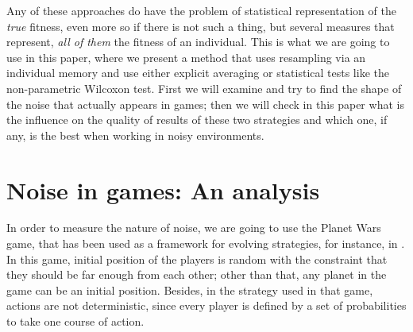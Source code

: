\documentclass{llncs}
\begin{document}
Any of these approaches do have the problem of statistical
representation of the {\em true} fitness, even more so if there is not
such a thing, but several measures that represent, {\em all of them}
the fitness of an individual. This is what we are going to use in this
paper, where we present a method that uses resampling via an
individual memory and use either explicit averaging or statistical
tests like the non-parametric Wilcoxon test. 
First we will examine and try to find the shape of the noise that
actually appears in games; then we will check in this paper what is the influence on the quality of
results of these two strategies and which one, if any, is the best when working in noisy environments. 


\section{Noise in games: An analysis}
\label{sec:noise}

In order to measure the nature of noise, we are going to use the
Planet Wars game, that has been used as a framework for evolving
strategies, for instance, in \cite{DBLP:journals/jcst/MoraFGGF12}. In
this game, initial position of the players is random with the
constraint that they should be far enough from each other; other than
that, any planet in the game can be an initial position. Besides, in
the strategy used in that game, actions are not deterministic, since
every player is defined by a set of probabilities to take one course
of action.
\end{document}
